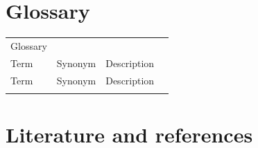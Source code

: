\documentclass[]{article}
\begin{document}
\section{Glossary}

\begin{longtable}[c]{@{}llll@{}}
\toprule\addlinespace
\begin{minipage}[b]{0.22\columnwidth}\raggedright
Glossary
\end{minipage} & \begin{minipage}[b]{0.22\columnwidth}\raggedright
\end{minipage} & \begin{minipage}[b]{0.22\columnwidth}\raggedright
\end{minipage} & \begin{minipage}[b]{0.22\columnwidth}\raggedright
\end{minipage}
\\\addlinespace
\midrule\endhead
\begin{minipage}[t]{0.22\columnwidth}\raggedright
Term
\end{minipage} & \begin{minipage}[t]{0.22\columnwidth}\raggedright
Synonym
\end{minipage} & \begin{minipage}[t]{0.22\columnwidth}\raggedright
Description
\end{minipage} & \begin{minipage}[t]{0.22\columnwidth}\raggedright
\end{minipage}
\\\addlinespace
\begin{minipage}[t]{0.22\columnwidth}\raggedright
Term
\end{minipage} & \begin{minipage}[t]{0.22\columnwidth}\raggedright
Synonym
\end{minipage} & \begin{minipage}[t]{0.22\columnwidth}\raggedright
Description
\end{minipage} & \begin{minipage}[t]{0.22\columnwidth}\raggedright
\end{minipage}
\\\addlinespace
\bottomrule
\end{longtable}

\section{Literature and references}
\end{document}
